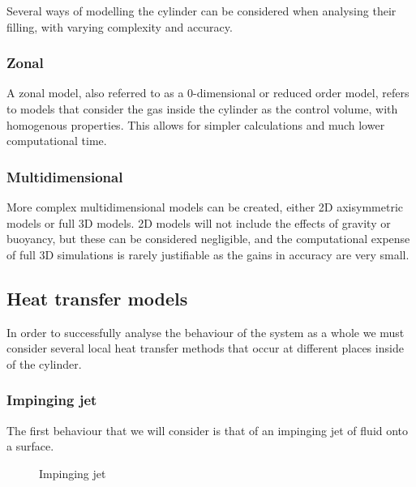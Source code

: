 Several ways of modelling the cylinder can be considered when analysing their filling, with varying complexity and accuracy.

\subsubsection{Zonal}

A zonal model, also referred to as a 0-dimensional or reduced order model, refers to models that consider the gas inside the cylinder as the control volume, with homogenous properties. This allows for simpler calculations and much lower computational time.   

\subsubsection{Multidimensional}
\label{sec:multidimensional}

More complex multidimensional models can be created, either 2D axisymmetric models or full 3D models. 2D models will not include the effects of gravity or buoyancy, but these can be considered negligible, and the computational expense of full 3D simulations is rarely justifiable as the gains in accuracy are very small. 


\subsection{Heat transfer models}

In order to successfully analyse the behaviour of the system as a whole we must consider several local heat transfer methods that occur at different places inside of the cylinder.



\subsubsection{Impinging jet}

 The first behaviour that we will consider is that of an impinging jet of fluid onto a surface. 
 
 
 \begin{figure}[h]
\begin{centering}
\caption{Impinging jet}
\label{fig:inpinging_jet}
\end{centering}
\end{figure}


